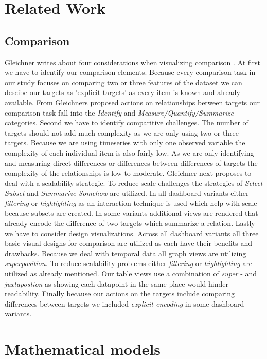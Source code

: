 \documentclass[12pt, twoside]{article}
\begin{document}
\section{Related Work}
\subsection*{Comparison}
Gleichner writes about four considerations when visualizing comparison \citep*{Gleicher.2018}.
At first we have to identify our comparison elements. Because every comparison task in our
study focuses on comparing two or three features of the dataset we can descibe our targets as
'explicit targets' as every item is known and already available. From Gleichners proposed
actions on relationships between targets our comparison task fall into the \textit{Identify}
and \textit{Measure/Quantify/Summarize} categories. Second we have to identify comparitive
challenges. The number of targets should not add much complexity as we are only using two
or three targets. Because we are using timeseries with only one observed variable the
complexity of each individual item is also fairly low. As we are only identifying and
measuring direct differences or differences between differences of targets the complexity
of the relationships is low to moderate. Gleichner next proposes to deal with a scalability
strategie. To reduce scale challenges the strategies of \textit{Select Subset} and 
\textit{Summarize Somehow} are utilized. In all dashboard variants either \textit{filtering} or
\textit{highlighting} as an interaction technique is used which help with scale because subsets
are created. In some variants additional views are rendered that already encode the
difference of two targets which summarize a relation. Lastly we have to consider design
visualizations. Across all dashboard variants all three basic visual designs for comparison
are utilized as each have their benefits and drawbacks. Because we deal with temporal data
all graph views are utilizing \textit{superposition}. To reduce scalability problems either
\textit{filtering} or \textit{highlighting} are utilized as already mentioned. Our table views
use a combination of \textit{super} - and \textit{juxtapostion} as showing each datapoint in the
same place would hinder readability. Finally because our actions on the targets include comparing
differences between targets we included \textit{explicit encoding} in some dashboard variants.

\section{Mathematical models}
\end{document}
